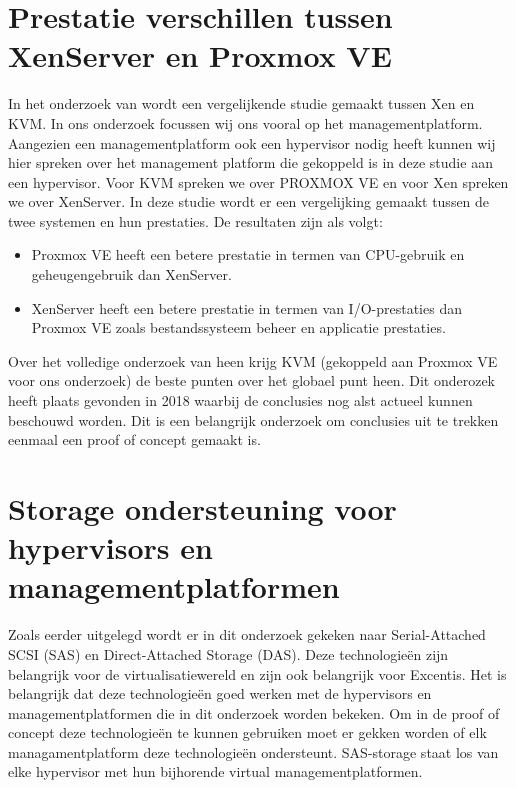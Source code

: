 \section{Prestatie verschillen tussen XenServer en Proxmox VE}
In het onderzoek van \textcite{algarni2018performance} wordt een vergelijkende studie gemaakt tussen Xen en KVM. In ons onderzoek focussen wij ons vooral op het managementplatform.
Aangezien een managementplatform ook een hypervisor nodig heeft kunnen wij hier spreken over het management platform die gekoppeld is in deze studie aan een hypervisor.
Voor KVM spreken we over PROXMOX VE en voor Xen spreken we over XenServer. In deze studie wordt er een vergelijking gemaakt tussen de twee systemen en hun prestaties. De resultaten zijn als volgt:

\begin{itemize}
    \item Proxmox VE heeft een betere prestatie in termen van CPU-gebruik en geheugengebruik dan XenServer.
    \item XenServer heeft een betere prestatie in termen van I/O-prestaties dan Proxmox VE zoals bestandssysteem beheer en applicatie prestaties.
\end{itemize}                               
Over het volledige onderzoek van \textcite{algarni2018performance} heen krijg KVM (gekoppeld aan Proxmox VE voor ons onderzoek) de beste punten over het globael punt heen. Dit onderozek heeft plaats gevonden in 2018 waarbij de conclusies nog alst actueel kunnen beschouwd worden.
Dit is een belangrijk onderzoek om conclusies uit te trekken eenmaal een proof of concept gemaakt is.

\section{Storage ondersteuning voor hypervisors en managementplatformen}

Zoals eerder uitgelegd wordt er in dit onderzoek gekeken naar Serial-Attached SCSI (SAS) en Direct-Attached Storage (DAS). Deze technologieën zijn belangrijk voor de virtualisatiewereld en zijn ook belangrijk voor Excentis. Het is belangrijk dat deze technologieën goed werken met de hypervisors en managementplatformen die in dit onderzoek worden bekeken.
Om in de proof of concept deze technologieën te kunnen gebruiken moet er gekken worden of elk managamentplatform deze technologieën ondersteunt.
SAS-storage staat los van elke hypervisor met hun bijhorende virtual managementplatformen.

